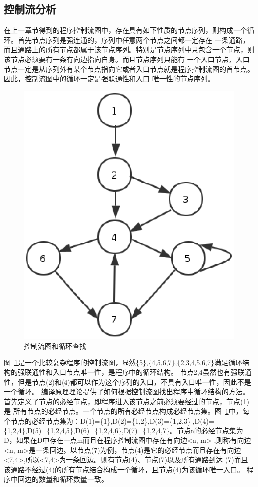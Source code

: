 \subsection{控制流分析}
在上一章节得到的程序控制流图中，存在具有如下性质的节点序列，则构成一个循环。首先节点序列是强连通的，序列中任意两个节点之间都一定存在
一条通路，而且通路上的所有节点都属于该节点序列。特别是节点序列中只包含一个节点，则该节点必须要有一条有向边指向自身。而且节点序列只能有
一个入口节点，入口节点一定是从序列外有某个节点指向它或者入口节点就是程序控制流图的首节点。因此，控制流图中的循环一定是强联通性和入口
唯一性的节点序列。
\begin{figure}
\centering
\includegraphics[width=0.6\linewidth]{figure8.eps}
\caption{控制流图和循环查找}\label{figure8}
\end{figure}
图~\ref{figure8}是一个比较复杂程序的控制流图，显然\{5\},\{4,5,6,7\},\{2,3,4,5,6,7\}满足循环结构的强联通性和入口节点唯一性，是程序中的循环结构。
节点{2,4}虽然也有强联通性，但是节点(2)和(4)都可以作为这个序列的入口，不具有入口唯一性，因此不是一个循环。
编译原理理论提供了如何根据控制流图找出程序中循环结构的方法。首先定义了节点的必经节点，即程序进入该节点之前必须要经过的节点，节点(1)是
所有节点的必经节点。一个节点的所有必经节点构成必经节点集。图~\ref{figure8}中，每个节点的必经节点集为：D(1)=\{1\},D(2)=\{1,2\},D(3)=\{1,2,3\}
,D(4)=\{1,2,4\},D(5)=\{1,2,4,5\},D(6)=\{1,2,4,6\},D(7)=\{1,2,4,7\}。节点n的必经节点集为D，如果在D中存在一点m而且在程序控制流图中存在有向边<n, m>
,则称有向边<n, m>是一条回边。以节点(7)为例，节点(4)是它的必经节点而且存在有向边<7,4>,所以<7,4>为一条回边。则有节点(4)、节点(7)以及所有通路到达
(7)而且该通路不经过(4)的所有节点结合构成一个循环，且节点(4)为该循环唯一入口。
程序中回边的数量和循环数量一致。

